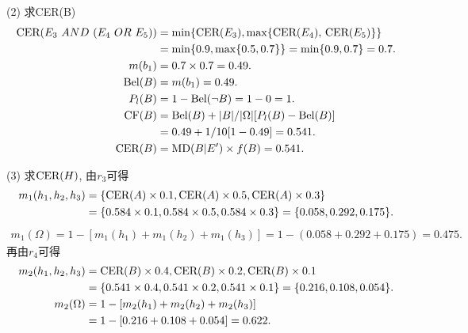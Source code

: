 (2) 求\textup{CER}(B)
\begin{align*}
 \textup{CER}(E_3 \,\, AND\,\,  (E_4\,\,  OR\,\,  E_5))&=\min\{\textup{CER}(E_3), \max\{\textup{CER}(E_4),\, \textup{CER}(E_5)\}\}\\
                                                        &=\min\{0.9, \max\{0.5, 0.7\}\}=\min\{0.9, 0.7\}=0.7. \\
 m({b_1})&=0.7\times 0.7=0.49.\\
   \textup{Bel}(B)&=m({b_1})=0.49.\\
   P_l(B)&=1-\textup{Bel}(\neg B)=1-0=1.\\
   \textup{CF}(B)&=\textup{Bel}(B)+|B|/|\Omega|[P_l(B)-\textup{Bel}(B)]\\
       &=0.49+1/10[1-0.49]=0.541.\\
 \textup{CER}(B)&=\textup{MD}(B|E')\times f(B)=0.541.
\end{align*}

(3) 求$\textup{CER}(H)$, 由$r_3$可得
\begin{align*}
    m_1({h_1}, {h_2}, {h_3})&=\{\textup{CER}(A)\times 0.1, \textup{CER}(A)\times 0.5, \textup{CER}(A)\times 0.3\}\\
                      &=\{0.584\times 0.1, 0.584\times 0.5, 0.584\times 0.3\}=\{0.058, 0.292, 0.175\}.
\end{align*}
\begin{align*}
    m_1(\Omega)=1-[m_1({h_1})+m_1({h_2})+m_1({h_3})] =1-(0.058+0.292+0.175)=0.475.
\end{align*}
再由$r_4$可得
\begin{align*}
  m_2({h_1}, {h_2}, {h_3})&={\textup{CER}(B)\times 0.4, \textup{CER}(B)\times 0.2, \textup{CER}(B)\times 0.1}\\
        &=\{0.541\times 0.4, 0.541\times 0.2, 0.541\times 0.1\}=\{0.216, 0.108, 0.054\}.\\
  m_2(\Omega) &=1-[m_2({h_1})+m_2({h_2})+m_2({h_3})]\\
              &=1-[0.216+0.108+0.054]=0.622.
\end{align*}

